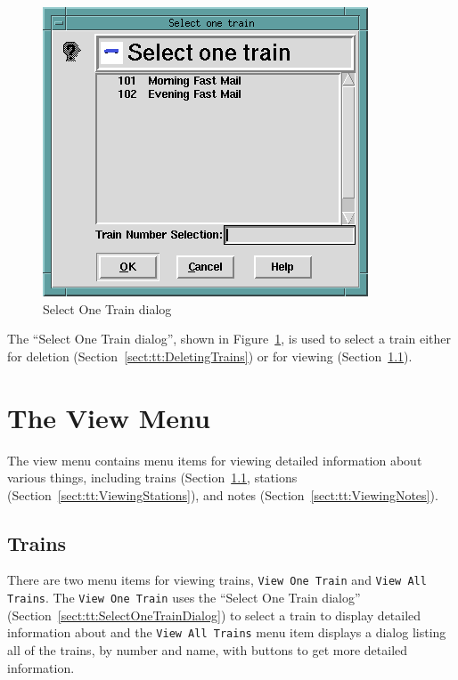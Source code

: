 \begin{figure}[hbpt] 
\begin{centering}
\includegraphics{TTSelectOneTrain.png} 
\caption{Select One Train dialog} 
\label{fig:tt:SelectOneTrainDialog} 
\end{centering}
\end{figure} The ``Select One Train dialog'', shown in
Figure~\ref{fig:tt:SelectOneTrainDialog}, is used to select a train
either for deletion (Section~\ref{sect:tt:DeletingTrains}) or for
viewing (Section~\ref{sect:tt:ViewingTrains}).

\section{The View Menu}

The view menu contains menu items for viewing detailed information about
various things, including trains (Section~\ref{sect:tt:ViewingTrains},
stations (Section~\ref{sect:tt:ViewingStations}), and  notes
(Section~\ref{sect:tt:ViewingNotes}).

\subsection{Trains}
\label{sect:tt:ViewingTrains}

There are two menu items for viewing trains, \texttt{View One Train} and
\texttt{View All Trains}.  The \texttt{View One Train} uses the ``Select
One Train dialog'' (Section~\ref{sect:tt:SelectOneTrainDialog}) to
select a train to display detailed information about and the
\texttt{View All Trains} menu item displays a dialog listing all of the
trains, by number and name, with buttons to get more detailed information.

